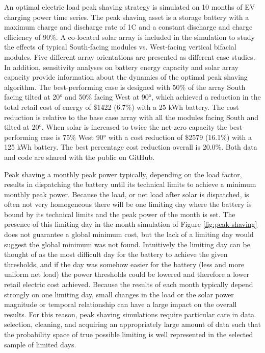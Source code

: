 \documentclass[journal,article,submit,pdftex,moreauthors]{Definitions/mdpi}
\begin{document}
An optimal electric load peak shaving strategy is simulated on 10 months of EV charging power time series. The peak shaving asset is a storage battery with a maximum charge and discharge rate of 1C and a constant discharge and charge efficiency of 90\%. A co-located solar array is included in the simulation to study the effects of typical South-facing modules vs. West-facing vertical bifacial modules. Five different array orientations are presented as different case studies. In addition, sensitivity analyses on battery energy capacity and solar array capacity provide information about the dynamics of the optimal peak shaving algorithm. The best-performing case is designed with 50\% of the array South facing tilted at 20° and 50\% facing West at 90°, which achieved a reduction in the total retail cost of energy of \$1422 (6.7\%) with a 25 kWh battery. The cost reduction is relative to the base case array with all the modules facing South and tilted at 20°. When solar is increased to twice the net-zero capacity the best-performing case is 75\% West 90° with a cost reduction of \$2579 (16.1\%) with a 125 kWh battery. The best percentage cost reduction overall is 20.0\%. Both data and code are shared with the public on GitHub.

Peak shaving a monthly peak power typically, depending on the load factor, results in dispatching the battery until its technical limits to achieve a minimum monthly peak power. Because the load, or net load after solar is dispatched, is often not very homogeneous there will be one limiting day where the battery is bound by its technical limits and the peak power of the month is set. The presence of this limiting day in the month simulation of Figure \ref{fig:peak-shaving} does not guarantee a global minimum cost, but the lack of a limiting day would suggest the global minimum was not found. Intuitively the limiting day can be thought of as the most difficult day for the battery to achieve the given thresholds, and if the day was somehow easier for the battery (less and more uniform net load) the power thresholds could be lowered and therefore a lower retail electric cost achieved. Because the results of each month typically depend strongly on one limiting day, small changes in the load or the solar power magnitude or temporal relationship can have a large impact on the overall results. For this reason, peak shaving simulations require particular care in data selection, cleaning, and acquiring an appropriately large amount of data such that the probability space of true possible limiting is well represented in the selected sample of limited days.
\end{document}
